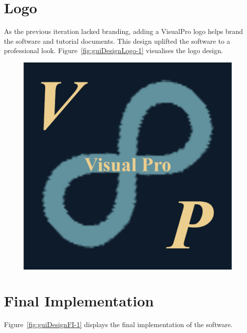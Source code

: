 \documentclass[12pt]{report} %
\begin{document}
		\section{Logo}
			As the previous iteration lacked branding, adding a VisualPro logo helps brand the software and tutorial documents. This design uplifted the software to a professional look. Figure~\ref{fig:guiDesignLogo-1} visualises the logo design.

			\begin{figure}[H]
				{\includegraphics[scale=0.55]{Figures/logo/VP-Logo-Large.png}}
			\end{figure}

		\section{Final Implementation}
			Figure~\ref{fig:guiDesignFI-1} displays the final implementation of the software.
\end{document}
